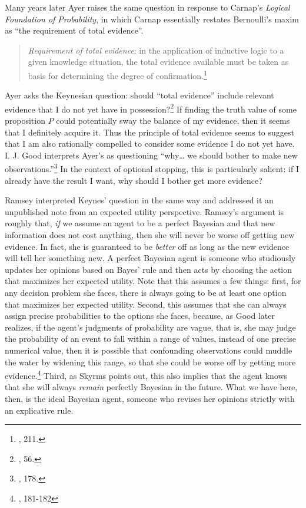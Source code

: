 Many years later Ayer raises the same question in
response to Carnap's \emph{Logical Foundation of Probability}, in which
Carnap essentially restates Bernoulli's maxim as ``the requirement of
total evidence''.

\begin{quote}
\emph{Requirement of total evidence}: in the application of inductive
logic to a given knowledge situation, the total evidence available must
be taken as basis for determining the degree of confirmation.\footnote{\cite{carnapprob}, 211.}
\end{quote}

Ayer asks the Keynesian question: should ``total evidence'' include
relevant evidence that I do not yet have in possession?\footnote{\cite{ayerpae}, 56.} If finding the truth value of some
proposition \(P\) could potentially sway the balance of my evidence,
then it seems that I definitely acquire it. Thus the principle of total
evidence seems to suggest that I am also rationally compelled to
consider some evidence I do not yet have. I. J. Good interprets Ayer's as questioning ``why\ldots{} we should
bother to make new observations.''\footnote{\cite{goodthinking}, 178.} In the context of optional stopping, this
is particularly salient: if I already have the result I want, why should
I bother get more evidence?

Ramsey interpreted Keynes' question in the same way and addressed it an unpublished note from an expected utility perspective. Ramsey's argument is roughly that,
\emph{if} we assume an agent to be a perfect Bayesian and that new
information does not cost anything, then she will never be  worse off
getting new evidence. In fact, she is guaranteed to be \emph{better} off
as long as the new evidence will tell her something new. A perfect
Bayesian agent is someone who studiously updates her opinions based on
Bayes' rule and then acts by choosing the action that maximizes her
expected utility. Note that this assumes a few things: first, for any
decision problem she faces, there is always going to be at least one
option that maximizes her expected utility. Second, this assumes that she can always assign precise probabilities to the options she faces, because, as Good later realizes, if the agent's judgments of probability are vague, that is, she may judge the probability of an event to fall within a range of values, instead of one precise numerical value, then it is possible that confounding observations could muddle the water by widening this range, so that she could be worse off by getting more evidence.\footnote{\cite{goodthinking}, 181-182} Third, as Skyrms points
out, this also implies that the agent knows that she will always
\emph{remain} perfectly Bayesian in the future. What we have here,
then, is the ideal Bayesian agent, someone who revises her opinions strictly with an explicative rule.

